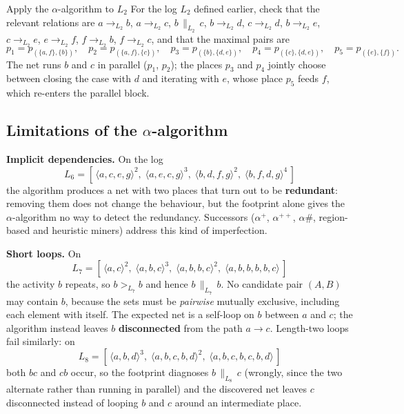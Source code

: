 \begin{examplebox}{Apply the $\alpha$-algorithm to $L_2$}
For the log $L_2$ defined earlier, check that the relevant relations are $a \to_{L_2} b$, $a \to_{L_2} c$, $b \,\|_{L_2}\, c$, $b \to_{L_2} d$, $c \to_{L_2} d$, $b \to_{L_2} e$, $c \to_{L_2} e$, $e \to_{L_2} f$, $f \to_{L_2} b$, $f \to_{L_2} c$, and that the maximal pairs are
\[
  p_1 = p_{(\{a, f\}, \{b\})},\quad p_2 = p_{(\{a, f\}, \{c\})},\quad p_3 = p_{(\{b\}, \{d, e\})},\quad p_4 = p_{(\{c\}, \{d, e\})},\quad p_5 = p_{(\{e\}, \{f\})}.
\]
The net runs $b$ and $c$ in parallel ($p_1$, $p_2$); the places $p_3$ and $p_4$ jointly choose between closing the case with $d$ and iterating with $e$, whose place $p_5$ feeds $f$, which re-enters the parallel block.
\end{examplebox}

\subsection{Limitations of the $\alpha$-algorithm}

\textbf{Implicit dependencies.} On the log
\[
  L_6 = [\,\langle a, c, e, g\rangle^2,\;\langle a, e, c, g\rangle^3,\;\langle b, d, f, g\rangle^2,\;\langle b, f, d, g\rangle^4\,]
\]
the algorithm produces a net with two places that turn out to be \textbf{redundant}: removing them does not change the behaviour, but the footprint alone gives the $\alpha$-algorithm no way to detect the redundancy. Successors ($\alpha^+$, $\alpha^{++}$, $\alpha\#$, region-based and heuristic miners) address this kind of imperfection.

\textbf{Short loops.} On
\[
  L_7 = [\,\langle a, c\rangle^2,\;\langle a, b, c\rangle^3,\;\langle a, b, b, c\rangle^2,\;\langle a, b, b, b, b, c\rangle\,]
\]
the activity $b$ repeats, so $b >_{L_7} b$ and hence $b \,\|_{L_7}\, b$. No candidate pair $(A, B)$ may contain $b$, because the sets must be \emph{pairwise} mutually exclusive, including each element with itself. The expected net is a self-loop on $b$ between $a$ and $c$; the algorithm instead leaves $b$ \textbf{disconnected} from the path $a \to c$. Length-two loops fail similarly: on
\[
  L_8 = [\,\langle a, b, d\rangle^3,\;\langle a, b, c, b, d\rangle^2,\;\langle a, b, c, b, c, b, d\rangle\,]
\]
both $bc$ and $cb$ occur, so the footprint diagnoses $b \,\|_{L_8}\, c$ (wrongly, since the two alternate rather than running in parallel) and the discovered net leaves $c$ disconnected instead of looping $b$ and $c$ around an intermediate place.

